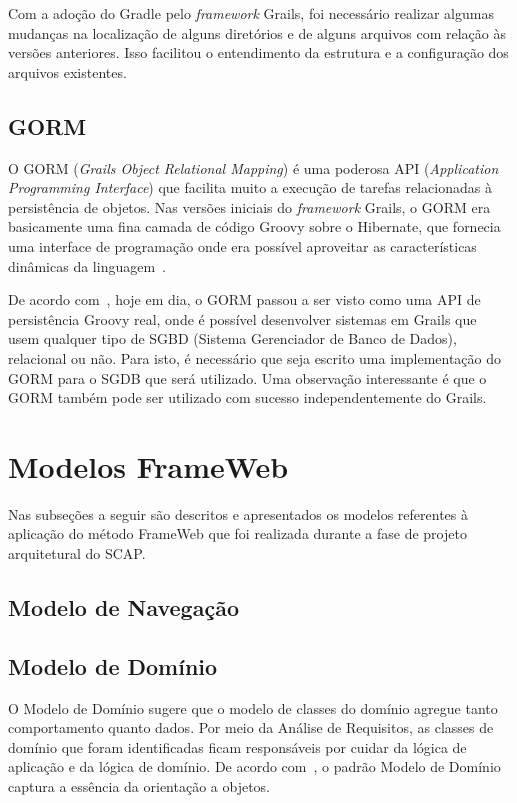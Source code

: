 Com a adoção do Gradle pelo \textit{framework} Grails, foi necessário realizar algumas mudanças na localização de alguns diretórios e de alguns arquivos com relação às versões anteriores. Isso facilitou o entendimento da estrutura e a configuração dos arquivos existentes.

\subsection{GORM}
\label{sec-projeto-gorm}

O GORM (\textit{Grails Object Relational Mapping}) é uma poderosa API (\textit{Application Programming Interface}) que facilita muito a execução de tarefas relacionadas à persistência de objetos. Nas versões iniciais do \textit{framework} Grails, o GORM era basicamente uma fina camada de código Groovy sobre o Hibernate, que fornecia uma interface de programação onde era possível aproveitar as características dinâmicas da linguagem~\cite{weissmann:fgapdw15}.

De acordo com~, hoje em dia, o GORM passou a ser visto como uma API de persistência Groovy real, onde é possível desenvolver sistemas em Grails que usem qualquer tipo de SGBD (Sistema Gerenciador de Banco de Dados), relacional ou não. Para isto, é necessário que seja escrito uma implementação do GORM para o SGDB que será utilizado. Uma observação interessante é que o GORM também pode ser utilizado com sucesso independentemente do Grails.  

\section{Modelos FrameWeb}
\label{sec-projeto-modelos-frameweb}

Nas subseções a seguir são descritos e apresentados os modelos referentes à aplicação do método FrameWeb que foi realizada durante a fase de projeto arquitetural do SCAP.

\subsection{Modelo de Navegação}
\label{sec-projeto-modelo-navegacao}

\subsection{Modelo de Domínio}
\label{sec-projeto-modelo-dominio}

O Modelo de Domínio sugere que o modelo de classes do domínio agregue tanto comportamento quanto dados. Por meio da Análise de Requisitos, as classes de domínio que foram identificadas ficam responsáveis por cuidar da lógica de aplicação e da lógica de domínio. De acordo com~, o padrão Modelo de Domínio captura a essência da orientação a objetos.

